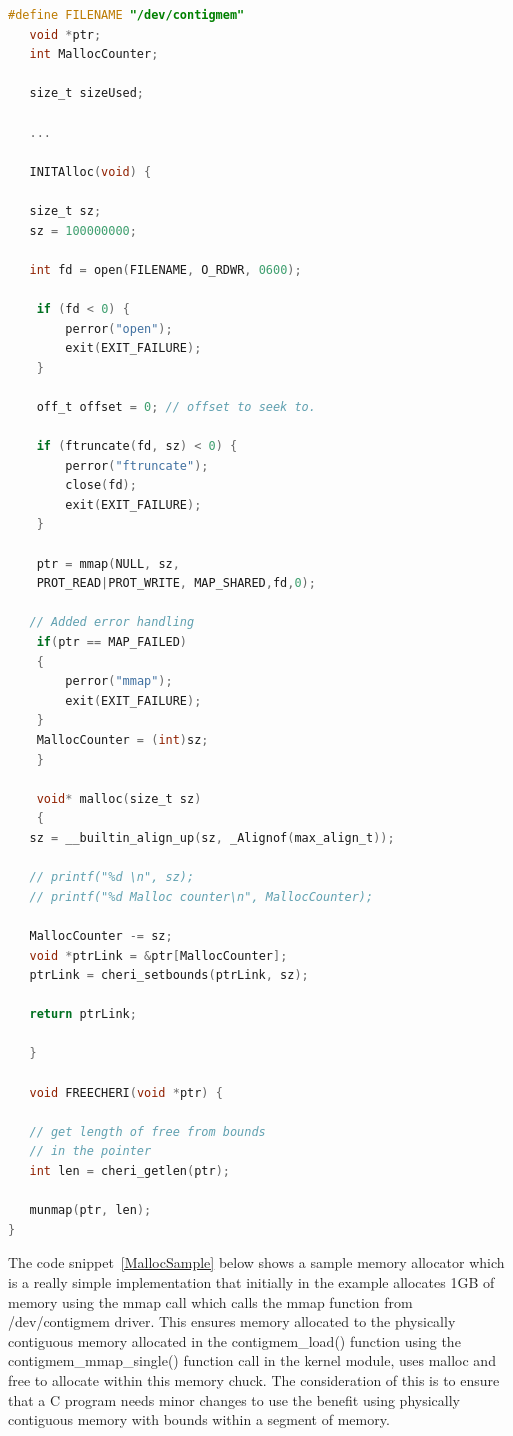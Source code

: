 \begin{lstlisting}[language=C, caption=Contigmem driver mmap , label=MallocSample]
   #define FILENAME "/dev/contigmem"
   void *ptr;
   int MallocCounter;

   size_t sizeUsed;
   
   ... 

   INITAlloc(void) {

   size_t sz;
   sz = 100000000;

   int fd = open(FILENAME, O_RDWR, 0600);

    if (fd < 0) {
        perror("open");
        exit(EXIT_FAILURE);
    }

    off_t offset = 0; // offset to seek to.

    if (ftruncate(fd, sz) < 0) {
        perror("ftruncate");
        close(fd);
        exit(EXIT_FAILURE);
    }

    ptr = mmap(NULL, sz,
    PROT_READ|PROT_WRITE, MAP_SHARED,fd,0);

   // Added error handling
    if(ptr == MAP_FAILED)
    {
        perror("mmap");
        exit(EXIT_FAILURE);
    }
    MallocCounter = (int)sz;
    }

    void* malloc(size_t sz)
    {
   sz = __builtin_align_up(sz, _Alignof(max_align_t));

   // printf("%d \n", sz);
   // printf("%d Malloc counter\n", MallocCounter);

   MallocCounter -= sz;
   void *ptrLink = &ptr[MallocCounter];
   ptrLink = cheri_setbounds(ptrLink, sz);

   return ptrLink;
     
   }

   void FREECHERI(void *ptr) { 

   // get length of free from bounds
   // in the pointer
   int len = cheri_getlen(ptr);

   munmap(ptr, len);
}

\end{lstlisting}

The code snippet~\ref{MallocSample} below shows a sample memory allocator
which is a really simple implementation that initially 
in the example allocates 1GB of memory using the mmap call which calls 
the mmap function from /dev/contigmem driver. This ensures memory allocated to the physically
contiguous memory allocated in the contigmem\_load() function using the contigmem\_mmap\_single()
function call in the kernel module, uses malloc 
and free to allocate within this memory chuck. The consideration of this is to ensure that a C program needs minor changes to use the benefit
using physically contiguous memory with bounds within a segment of memory.